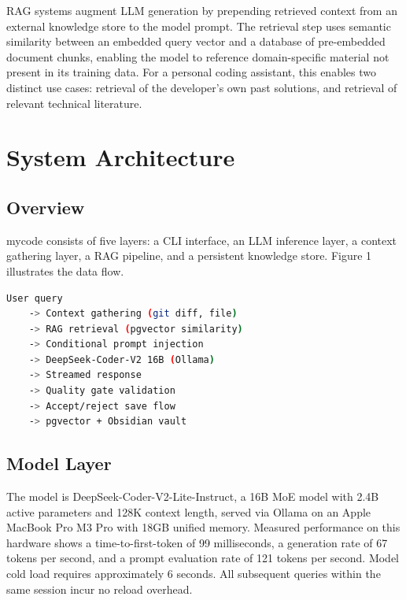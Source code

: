 \documentclass[11pt,twocolumn]{article}
\begin{document}
RAG systems augment LLM generation by prepending retrieved context from an
external knowledge store to the model prompt. The retrieval step uses semantic
similarity between an embedded query vector and a database of pre-embedded
document chunks, enabling the model to reference domain-specific material not
present in its training data. For a personal coding assistant, this enables
two distinct use cases: retrieval of the developer's own past solutions, and
retrieval of relevant technical literature.

\section{System Architecture}

\subsection{Overview}

mycode consists of five layers: a CLI interface, an LLM inference layer, a
context gathering layer, a RAG pipeline, and a persistent knowledge store.
Figure 1 illustrates the data flow.

\begin{center}
\begin{minipage}{0.85\columnwidth}
\begin{lstlisting}[language=bash, caption=mycode query flow]
User query
    -> Context gathering (git diff, file)
    -> RAG retrieval (pgvector similarity)
    -> Conditional prompt injection
    -> DeepSeek-Coder-V2 16B (Ollama)
    -> Streamed response
    -> Quality gate validation
    -> Accept/reject save flow
    -> pgvector + Obsidian vault
\end{lstlisting}
\end{minipage}
\end{center}

\subsection{Model Layer}

The model is DeepSeek-Coder-V2-Lite-Instruct, a 16B MoE model with 2.4B
active parameters and 128K context length, served via Ollama on an Apple
MacBook Pro M3 Pro with 18GB unified memory. Measured performance on this
hardware shows a time-to-first-token of 99 milliseconds, a generation rate
of 67 tokens per second, and a prompt evaluation rate of 121 tokens per
second. Model cold load requires approximately 6 seconds. All subsequent
queries within the same session incur no reload overhead.
\end{document}
